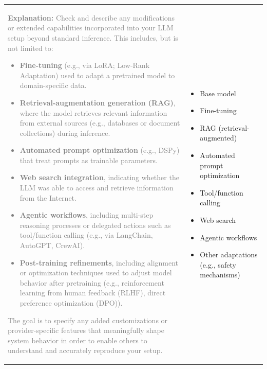 \documentclass[12pt]{article}
\newcommand{\unchecked}{\ding{111}} %
\begin{document}
\begin{longtable}{|p{}|p{}|}
\textcolor{gray}{{\footnotesize
\textbf{Explanation:} Check and describe any modifications or extended capabilities incorporated into your LLM setup beyond standard inference. This includes, but is not limited to:
\begin{itemize}[leftmargin=*]\setlength{\itemsep}{0pt}\setlength{\parskip}{0pt}
\item \textbf{Fine-tuning} (e.g., via LoRA; Low-Rank Adaptation) used to adapt a pretrained model to domain-specific data.
\item \textbf{Retrieval-augmentation generation (RAG)}, where the model retrieves relevant information from external sources (e.g., databases or document collections) during inference. 
\item \textbf{Automated prompt optimization} (e.g., DSPy) that treat prompts as trainable parameters.
\item \textbf{Web search integration}, indicating whether the LLM was able to access and retrieve information from the Internet.
\item \textbf{Agentic workflows}, including multi-step reasoning processes or delegated actions such as tool/function calling (e.g., via LangChain, AutoGPT, CrewAI). 
\item \textbf{Post-training refinements}, including alignment or optimization techniques used to adjust model behavior after pretraining (e.g., reinforcement learning from human feedback (RLHF), direct preference optimization (DPO)).
\end{itemize} 
The goal is to specify any added customizations or provider-specific features that meaningfully shape system behavior in order to enable others to understand and accurately reproduce your setup.
}}  &   \begin{itemize}[leftmargin=*]\setlength{\itemsep}{0pt}\setlength{\parskip}{0pt}
   \item[\unchecked] Base model  
   \item[\unchecked] Fine-tuning 
   \item[\unchecked] RAG (retrieval-augmented)
   \item[\unchecked] Automated prompt optimization
   \item[\unchecked] Tool/function calling
   \item[\unchecked] Web search
   \item[\unchecked] Agentic workflows
   \item[\unchecked] Other adaptations (e.g., safety mechanisms)
\end{itemize} 


\end{longtable}
\end{document}

